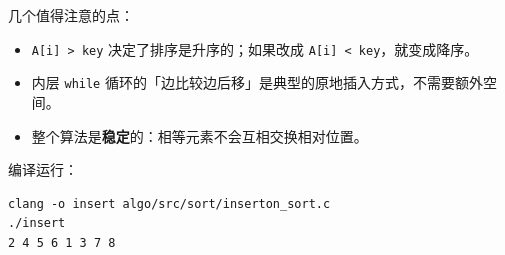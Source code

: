 几个值得注意的点：

\begin{itemize}
    \item \texttt{A[i] > key} 决定了排序是升序的；如果改成 \texttt{A[i] < key}，就变成降序。
    \item 内层 \texttt{while} 循环的「边比较边后移」是典型的原地插入方式，不需要额外空间。
    \item 整个算法是\textbf{稳定}的：相等元素不会互相交换相对位置。
\end{itemize}

编译运行：

\begin{lstlisting}[style=bashstyle]
clang -o insert algo/src/sort/inserton_sort.c
./insert
2 4 5 6 1 3 7 8
\end{lstlisting}
